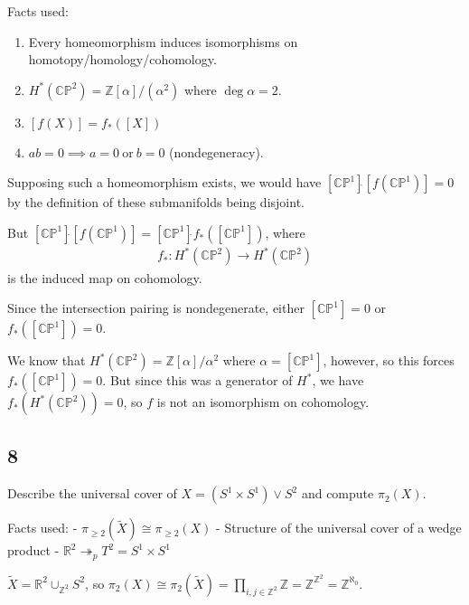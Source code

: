 \begin{solution}

Facts used:

\begin{enumerate}
\def\labelenumi{\arabic{enumi}.}
\tightlist
\item
  Every homeomorphism induces isomorphisms on
  homotopy/homology/cohomology.
\item
  \(H^*({\mathbb{CP}}^2) = {\mathbb{Z}}[\alpha] / (\alpha^2)\) where
  \(\deg \alpha = 2\).
\item
  \([f(X)] = f_*([X])\)
\item
  \(a\dot{} b = 0 \implies a=0~\text{or}~b=0\) (nondegeneracy).
\end{enumerate}

Supposing such a homeomorphism exists, we would have
\([{\mathbb{CP}}^1] \dot{} [f({\mathbb{CP}}^1)] = 0\) by the definition
of these submanifolds being disjoint.

But
\([{\mathbb{CP}}^1]\dot{}[f({\mathbb{CP}}^1)] = [{\mathbb{CP}}^1]\dot{} f_*([{\mathbb{CP}}^1])\),
where
\begin{align*}
f_*: H^*({\mathbb{CP}}^2) \to H^*({\mathbb{CP}}^2)
\end{align*}
is the induced map on cohomology.

Since the intersection pairing is nondegenerate, either
\([{\mathbb{CP}}^1] = 0\) or \(f_*([{\mathbb{CP}}^1]) = 0\).

We know that \(H^*({\mathbb{CP}}^2) = {\mathbb{Z}}[\alpha] / \alpha^2\)
where \(\alpha = [{\mathbb{CP}}^1]\), however, so this forces
\(f_*([{\mathbb{CP}}^1]) = 0\). But since this was a generator of
\(H^*\), we have \(f_*(H^*({\mathbb{CP}}^2)) = 0\), so \(f\) is not an
isomorphism on cohomology.

\end{solution}

\hypertarget{section-12}{%
\subsection{8}\label{section-12}}

Describe the universal cover of \(X = (S^1 \times S^1) \vee S^2\) and
compute \(\pi_2(X)\).

\begin{solution}

Facts used: - \(\pi_{\geq 2}(\tilde X) \cong \pi_{\geq 2}(X)\) -
Structure of the universal cover of a wedge product -
\({\mathbb{R}}^2 \twoheadrightarrow_p T^2 = S^1 \times S^1\)

\(\tilde X = {\mathbb{R}}^2 \cup_{{\mathbb{Z}}^2} S^2\), so
\(\pi_2(X) \cong \pi_2(\tilde X) = \prod_{i,j \in {\mathbb{Z}}^2} {\mathbb{Z}}= {\mathbb{Z}}^{{\mathbb{Z}}^2} = {\mathbb{Z}}^{\aleph_0}\).

\end{solution}


